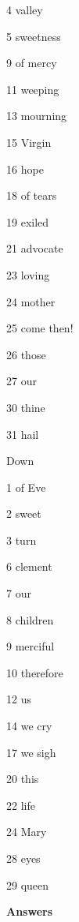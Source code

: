 \documentclass[12pt]{article}
\begin{document}
\begin{minipage}[t]{5cm}
\begin{list}{}{}
\item[4]{valley} 
\item[5]{sweetness} 
\item[9]{of mercy} 
\item[11]{weeping} 
\item[13]{mourning} 
\item[15]{Virgin} 
\item[16]{hope} 
\item[18]{of tears} 
\item[19]{exiled} 
\item[21]{advocate} 
\item[23]{loving} 
\item[24]{mother} 
\item[25]{come then!} 
\item[26]{those} 
\item[27]{our} 
\item[30]{thine} 
\item[31]{hail} 
\end{list}
\end{minipage}\begin{minipage}[t]{5cm}
\noindent Down 
\begin{list}{}{}
\item[1]{of Eve} 
\item[2]{sweet} 
\item[3]{turn} 
\item[6]{clement} 
\item[7]{our} 
\item[8]{children} 
\item[9]{merciful} 
\item[10]{therefore} 
\item[12]{us} 
\item[14]{we cry} 
\item[17]{we sigh} 
\item[20]{this} 
\item[22]{life} 
\item[24]{Mary} 
\item[28]{eyes} 
\item[29]{queen}
\end{list} 
\end{minipage}

\newpage

\begin{center}
\textbf{\huge Answers}
\end{center}
\end{document}

